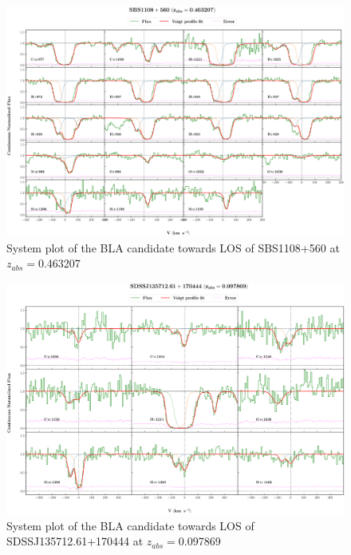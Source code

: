 \begin{landscape}
\begin{figure} 
  \centering  
  \hspace*{-21mm}
    \includegraphics[width=\linewidth]{Figures//system-plots/SBS1108+560_z=0.463207_sys_plot.png} 
  \caption{System plot of the BLA candidate towards LOS of SBS1108+560 at $z_{abs}=$0.463207} 
\end{figure}



\begin{figure} 
  \centering  
  \hspace*{-21mm}
    \includegraphics[width=\linewidth]{Figures//system-plots/SDSSJ135712.61+170444_z=0.097869_sys_plot.png} 
  \caption{System plot of the BLA candidate towards LOS of SDSSJ135712.61+170444 at $z_{abs}=$0.097869} 
\end{figure}

\end{landscape}

